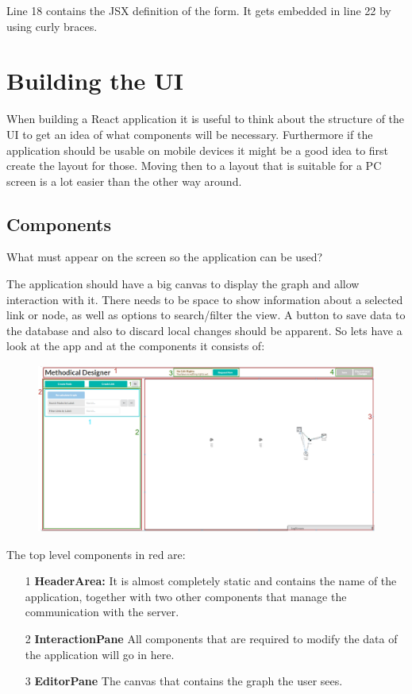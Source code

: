 Line 18 contains the JSX definition of the form. It gets embedded in line 22 by using curly braces.

\section{Building the UI}
When building a React application it is useful to think about the structure of the UI to get an idea of what components will be necessary. Furthermore if the application should be usable on mobile devices it might be a good idea to first create the layout for those. Moving then to a layout that is suitable for a PC screen is a lot easier than the other way around.

\subsection{Components}
What must appear on the screen so the application can be used?

The application should have a big canvas to display the graph and allow interaction with it. There needs to be space to show information about a selected link or node, as well as options to search/filter the view. A button to save data to the database and also to discard local changes should be apparent. So lets have a look at the app and at the components it consists of:
\begin{figure}[H]
\includegraphics[width=\textwidth, height=210px]{Bilder/Layout.png}
\end{figure}
The top level components in red are:
\begin{itemize}
\item[1] \textbf{HeaderArea:} It is almost completely static and contains the name of the application, together with two other components that manage the communication with the server.
\item[2] \textbf{InteractionPane} All components that are required to modify the data of the application will go in here.
\item[3] \textbf{EditorPane} The canvas that contains the graph the user sees.
\end{itemize}

